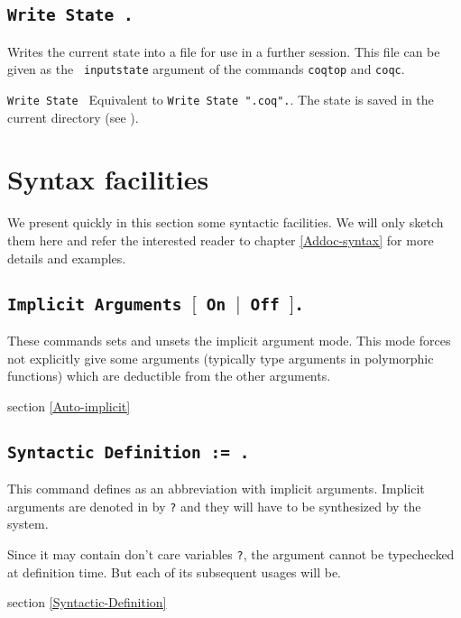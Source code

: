 \subsection{\tt Write State \str.}
Writes the current state into a file \str{} for
use in a further session. This file can be given as the {\tt
  inputstate} argument of the commands {\tt coqtop} and {\tt coqc}.

\begin{Variants}
\item {\tt Write State \ident}
 Equivalent to {\tt Write State "}{\ident}{\tt .coq".}.
 The state is saved in the current directory (see \pageref{Pwd}).
\end{Variants}

\section{Syntax facilities}

We present quickly in this section some syntactic facilities.
We will only sketch them here and refer the
interested reader to chapter \ref{Addoc-syntax} for more details and
examples.

\subsection{\tt Implicit Arguments $[$ On $|$ Off $]$.}

These commands sets and unsets the implicit argument mode. This mode
forces not explicitly give some arguments (typically type arguments in
polymorphic functions) which are deductible from the other arguments.

\SeeAlso section \ref{Auto-implicit}

\subsection{\tt Syntactic Definition {\ident} := \term.}
This command defines {\ident} as an
abbreviation with implicit arguments. Implicit arguments are denoted
in {\term} by {\tt ?} and they will have to be synthesized by the
system.

\Rem Since it may contain don't care variables {\tt ?}, the argument
{\term} cannot be typechecked at
definition time. But each of its subsequent usages will be.

\SeeAlso section \ref{Syntactic-Definition}


